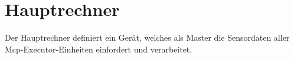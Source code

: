 \section{Hauptrechner}
\label{kap:Hauptrechner}
Der Hauptrechner definiert ein Gerät, welches als Master die Sensordaten aller Mcp-Executor-Einheiten einfordert und verarbeitet.  





